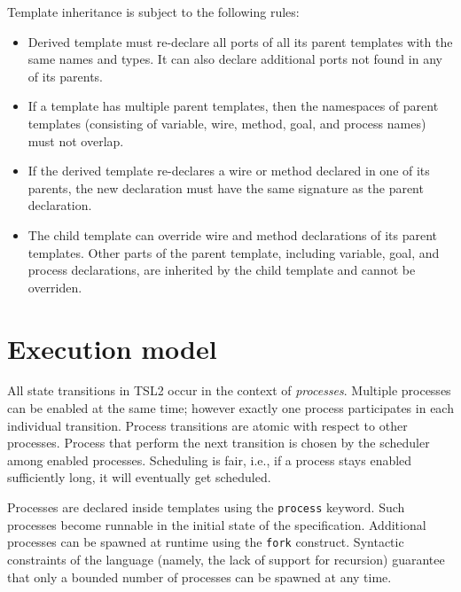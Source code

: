 \documentclass{report}
\newcommand{\src}[1]{\texttt{#1}}
\newcommand{\tsl}{TSL2 }
\begin{document}
Template inheritance is subject to the following rules:
\begin{itemize}
    \item Derived template must re-declare all ports of all its 
        parent templates with the same names and types.  It can 
        also declare additional ports not found in any of its 
        parents.

    \item If a template has multiple parent templates, then the 
        namespaces of parent templates (consisting of variable, 
        wire, method, goal, and process names) must not overlap.

    \item If the derived template re-declares a wire or method 
        declared in one of its parents, the new declaration must 
        have the same signature as the parent declaration.

    \item The child template can override wire and method 
        declarations of its parent templates.  Other parts of the 
        parent template, including variable, goal, and process 
        declarations, are inherited by the child template and 
        cannot be overriden.
\end{itemize}



\section{Execution model}\label{s:o:execmodel}

All state transitions in \tsl occur in the context of 
\emph{processes}.  Multiple processes can be enabled at the same 
time; however exactly one process participates in each individual 
transition.  Process transitions are atomic with respect to other 
processes.  Process that perform the next transition is chosen by 
the scheduler among enabled processes.  Scheduling is fair, i.e., 
if a process stays enabled sufficiently long, it will eventually 
get scheduled.

Processes are declared inside templates using the \src{process} 
keyword.  Such processes become runnable in the initial state of 
the specification.  Additional processes can be spawned at runtime 
using the \src{fork} construct.  Syntactic constraints of the 
language (namely, the lack of support for recursion) guarantee 
that only a bounded number of processes can be spawned at any 
time.  
\end{document}
